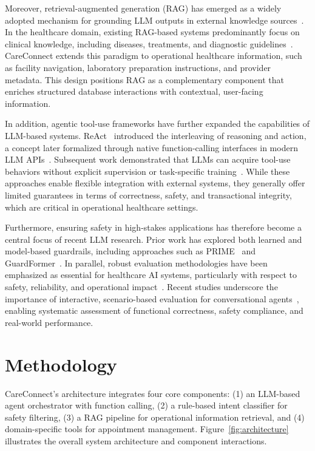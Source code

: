 \documentclass[conference]{IEEEtran}
\begin{document}
Moreover, retrieval-augmented generation (RAG) has emerged as a widely adopted mechanism for grounding LLM outputs in external knowledge sources~\cite{yang2025retrieval}. In the healthcare domain, existing RAG-based systems predominantly focus on clinical knowledge, including diseases, treatments, and diagnostic guidelines~\cite{xiong2024benchmarking,zhao2025medrag}. CareConnect extends this paradigm to operational healthcare information, such as facility navigation, laboratory preparation instructions, and provider metadata. This design positions RAG as a complementary component that enriches structured database interactions with contextual, user-facing information.

In addition, agentic tool-use frameworks have further expanded the capabilities of LLM-based systems. ReAct~\cite{yao2022react} introduced the interleaving of reasoning and action, a concept later formalized through native function-calling interfaces in modern LLM APIs~\cite{openai2023functions}. Subsequent work demonstrated that LLMs can acquire tool-use behaviors without explicit supervision or task-specific training~\cite{wei2022emergent,schick2023toolformer}. While these approaches enable flexible integration with external systems, they generally offer limited guarantees in terms of correctness, safety, and transactional integrity, which are critical in operational healthcare settings.

Furthermore, ensuring safety in high-stakes applications has therefore become a central focus of recent LLM research. Prior work has explored both learned and model-based guardrails, including approaches such as PRIME~\cite{mazagonwalla2025prime} and GuardFormer~\cite{o2024guardformer}. In parallel, robust evaluation methodologies have been emphasized as essential for healthcare AI systems, particularly with respect to safety, reliability, and operational impact~\cite{abbasian2024foundation,hua2024standardizing}. Recent studies underscore the importance of interactive, scenario-based evaluation for conversational agents~\cite{jiang2025medagentbench,johri2024craft}, enabling systematic assessment of functional correctness, safety compliance, and real-world performance.

\section{Methodology}
\label{sec:methodology}

CareConnect's architecture integrates four core components: (1) an LLM-based agent orchestrator with function calling, (2) a rule-based intent classifier for safety filtering, (3) a RAG pipeline for operational information retrieval, and (4) domain-specific tools for appointment management. Figure~\ref{fig:architecture} illustrates the overall system architecture and component interactions.
\end{document}

